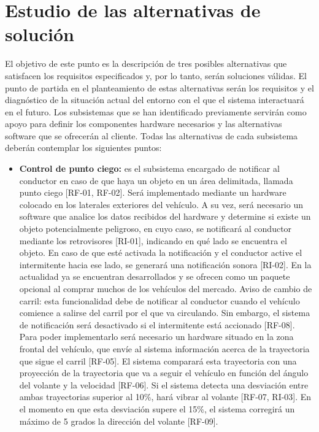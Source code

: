 \section{Estudio de las alternativas de solución}
El objetivo de este punto es la descripción de tres posibles alternativas que satisfacen los requisitos especificados y, por lo tanto, serán soluciones válidas. El punto de partida en el planteamiento de estas alternativas serán los requisitos y el diagnóstico de la situación actual del entorno con el que el sistema interactuará en el futuro. Los subsistemas que se han identificado previamente servirán como apoyo para definir los componentes hardware necesarios y las alternativas software que se ofrecerán al cliente. Todas las alternativas de cada subsistema deberán contemplar los siguientes puntos:

\begin{itemize}[-]
\item \textbf{Control de punto ciego:} es el subsistema encargado de notificar al conductor en caso de que haya un objeto en un área delimitada, llamada punto ciego [RF-01, RF-02]. Será implementado mediante un hardware colocado en los laterales exteriores del vehículo. A su vez, será necesario un software que analice los datos recibidos del hardware y determine si existe un objeto potencialmente peligroso, en cuyo caso, se notificará al conductor mediante los retrovisores [RI-01], indicando en qué lado se encuentra el objeto. En caso de que esté activada la notificación y el conductor active el intermitente hacia ese lado, se generará una notificación sonora [RI-02]. En la actualidad ya se encuentran desarrollados y se ofrecen como un paquete opcional al comprar muchos de los vehículos del mercado.
Aviso de cambio de carril: esta funcionalidad debe de notificar al conductor cuando el vehículo comience a salirse del carril por el que va circulando. Sin embargo, el sistema de notificación será desactivado si el intermitente está accionado [RF-08]. Para poder implementarlo será necesario un hardware situado en la zona frontal del vehículo, que envíe al sistema información acerca de la trayectoria que sigue el carril [RF-05].  El sistema comparará esta trayectoria con una proyección de la trayectoria que va a seguir el vehículo en función del ángulo del volante y la velocidad [RF-06]. Si el sistema detecta una desviación entre ambas trayectorias superior al 10\%, hará vibrar al volante [RF-07, RI-03]. En el momento en que esta desviación supere el 15\%, el sistema corregirá un máximo de 5 grados la dirección del volante [RF-09].

\end{itemize}
